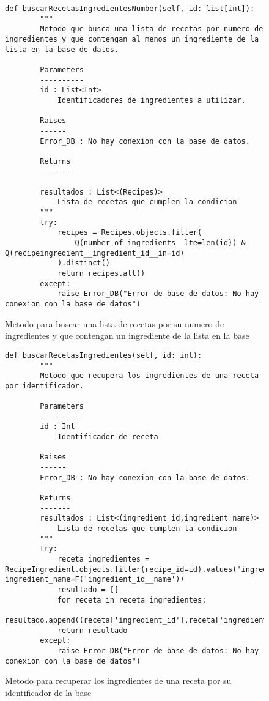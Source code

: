 \begin{figure}[H]
    \begin{lstlisting}[style=python]
        def buscarRecetasIngredientesNumber(self, id: list[int]):
        """
        Metodo que busca una lista de recetas por numero de ingredientes y que contengan al menos un ingrediente de la lista en la base de datos.

        Parameters
        ----------
        id : List<Int>
            Identificadores de ingredientes a utilizar.

        Raises
        ------
        Error_DB : No hay conexion con la base de datos.

        Returns
        -------
            
        resultados : List<(Recipes)>
            Lista de recetas que cumplen la condicion
        """
        try:
            recipes = Recipes.objects.filter(
                Q(number_of_ingredients__lte=len(id)) & Q(recipeingredient__ingredient_id__in=id)
            ).distinct()
            return recipes.all()
        except:
            raise Error_DB("Error de base de datos: No hay conexion con la base de datos")
    \end{lstlisting}
    \caption{Metodo para buscar una lista de recetas por su numero de ingredientes y que contengan un ingrediente de la lista en la \gls{base}}
    \label{sni:buscarRecetaNumeroIngredientes}
\end{figure}
\begin{figure}[H]
    \begin{lstlisting}[style=python]
        def buscarRecetasIngredientes(self, id: int):
        """
        Metodo que recupera los ingredientes de una receta por identificador.

        Parameters
        ----------
        id : Int
            Identificador de receta

        Raises
        ------
        Error_DB : No hay conexion con la base de datos.

        Returns
        -------
        resultados : List<(ingredient_id,ingredient_name)>
            Lista de recetas que cumplen la condicion
        """
        try:
            receta_ingredientes = RecipeIngredient.objects.filter(recipe_id=id).values('ingredient_id', ingredient_name=F('ingredient_id__name'))
            resultado = []
            for receta in receta_ingredientes:
                resultado.append((receta['ingredient_id'],receta['ingredient_name']))
            return resultado
        except:
            raise Error_DB("Error de base de datos: No hay conexion con la base de datos")
    \end{lstlisting}
    \caption{Metodo para recuperar los ingredientes de una receta por su identificador de la \gls{base}}
    \label{sni:buscarRecetaIDIngredientes}
\end{figure}
